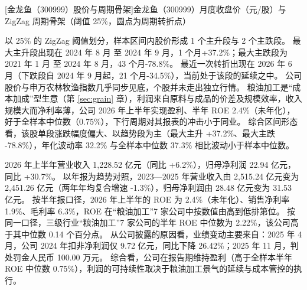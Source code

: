\begin{center}
\begin{minipage}{\textwidth}\centering
{}

[金龙鱼（300999）股价与周期骨架]{金龙鱼（300999）月度收盘价（元/股）与 ZigZag 周期骨架（阈值 25\%，圆点为周期转折点）}
\end{minipage}
\end{center}

 以 25\% 的 ZigZag 阈值划分，样本区间内股价形成 1 个主升段与 2 个主跌段。 最大主升段出现在 2024 年 8 月 至 2024 年 9 月，1 个月+37.2\%；最大主跌段为 2021 年 1 月 至 2024 年 8 月，43 个月-78.8\%。 最近一次转折出现在 2026 年 6 月（下跌段自 2024 年 9 月起，21 个月-34.5\%），当前处于该段的延续之中。 公司股价与申万农林牧渔指数几乎同步见底，个股并未走出独立行情。 粮油加工是“成本加成”型生意（第 \ref{sec:grain} 章），利润来自原料与成品的价差及规模效率，收入规模大而净利率薄，公司 2026 年上半年实现盈利、半年 ROE 2.4\%（未年化），好于全样本中位数（0.75\%），下行周期对其报表的冲击小于同业。 综合区间形态看，该股单段涨跌幅度偏大、以趋势段为主（最大主升 +37.2\%、最大主跌 -78.8\%），年化波动率 32.2\% 与全样本中位数 37.3\% 相比波动小于样本中位数。

 2026 年上半年营业收入 1,228.52 亿元（同比 +6.2\%），归母净利润 22.94 亿元，同比 +30.7\%。 以年报为趋势对照，2023---2025 年营业收入由 2,515.24 亿元变为 2,451.26 亿元（两年年均复合增速 -1.3\%），归母净利润由 28.48 亿元变为 31.53 亿元。 按半年报口径，2026 年上半年的 ROE 为 2.4\%（未年化）、销售净利率 1.9\%、毛利率 6.3\%，ROE 在“粮油加工”7 家公司中按数值由高到低排第位。 按同一口径，三级行业“粮油加工”7 家公司的半年 ROE 中位数为 2.22\%，该公司高于其中位数 0.14 个百分点。 从公司披露的原因看，业绩变动主要来自：2025 年 4 月，公司 2024 年扣非净利润仅 9.72 亿元，同比下降 26.42\%；2025 年 11 月，判处罚金人民币 100.00 万元。 综合看，公司在报告期维持盈利（高于全样本半年 ROE 中位数 0.75\%），利润的可持续性取决于粮油加工景气的延续与成本管控的执行。

